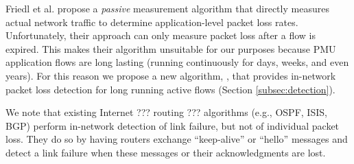 Friedl et al. \cite{Friedl09} propose a \emph{passive} measurement algorithm that directly measures actual network traffic to determine application-level packet loss rates. 
Unfortunately, their approach can only measure packet loss after a flow is expired.  This makes their algorithm unsuitable for our purposes because
PMU application flows are long lasting (running continuously for days, weeks, and even years). 
For this reason we propose a new algorithm, \fls, that provides in-network packet loss detection for long running active flows (Section \ref{subsec:detection}).

We note that existing Internet  ??? routing ??? algorithms (e.g., OSPF, ISIS, BGP) perform in-network detection of link failure, but not of individual packet loss. They do so by
having routers exchange ``keep-alive'' or ``hello'' messages and detect a link failure when these messages or their acknowledgments are lost.





